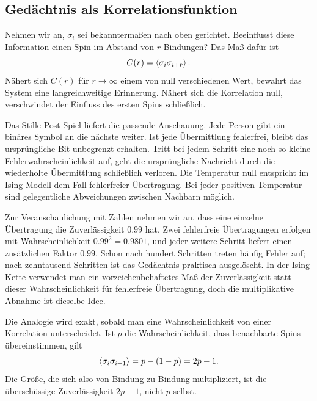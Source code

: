 \begin{classroomqa}
\end{classroomqa}

\subsection{Gedächtnis als Korrelationsfunktion}

Nehmen wir an, \(\sigma_i\) sei bekanntermaßen nach oben gerichtet. Beeinflusst diese Information einen Spin im Abstand von \(r\) Bindungen? Das Maß dafür ist
\begin{equation}
C(r)=\left\langle\sigma_i\sigma_{i+r}\right\rangle.
\end{equation}
Nähert sich \(C(r)\) für \(r\to\infty\) einem von null verschiedenen Wert, bewahrt das System eine langreichweitige Erinnerung. Nähert sich die Korrelation null, verschwindet der Einfluss des ersten Spins schließlich.

Das Stille-Post-Spiel liefert die passende Anschauung. Jede Person gibt ein binäres Symbol an die nächste weiter. Ist jede Übermittlung fehlerfrei, bleibt das ursprüngliche Bit unbegrenzt erhalten. Tritt bei jedem Schritt eine noch so kleine Fehlerwahrscheinlichkeit auf, geht die ursprüngliche Nachricht durch die wiederholte Übermittlung schließlich verloren. Die Temperatur null entspricht im Ising-Modell dem Fall fehlerfreier Übertragung. Bei jeder positiven Temperatur sind gelegentliche Abweichungen zwischen Nachbarn möglich.

Zur Veranschaulichung mit Zahlen nehmen wir an, dass eine einzelne Übertragung die Zuverlässigkeit \(0.99\) hat. Zwei fehlerfreie Übertragungen erfolgen mit Wahrscheinlichkeit \(0.99^2=0.9801\), und jeder weitere Schritt liefert einen zusätzlichen Faktor \(0.99\). Schon nach hundert Schritten treten häufig Fehler auf; nach zehntausend Schritten ist das Gedächtnis praktisch ausgelöscht. In der Ising-Kette verwendet man ein vorzeichenbehaftetes Maß der Zuverlässigkeit statt dieser Wahrscheinlichkeit für fehlerfreie Übertragung, doch die multiplikative Abnahme ist dieselbe Idee.

Die Analogie wird exakt, sobald man eine Wahrscheinlichkeit von einer Korrelation unterscheidet. Ist \(p\) die Wahrscheinlichkeit, dass benachbarte Spins übereinstimmen, gilt
\begin{equation}
\left\langle\sigma_i\sigma_{i+1}\right\rangle
=p-(1-p)=2p-1.
\end{equation}
Die Größe, die sich also von Bindung zu Bindung multipliziert, ist die überschüssige Zuverlässigkeit \(2p-1\), nicht \(p\) selbst.


